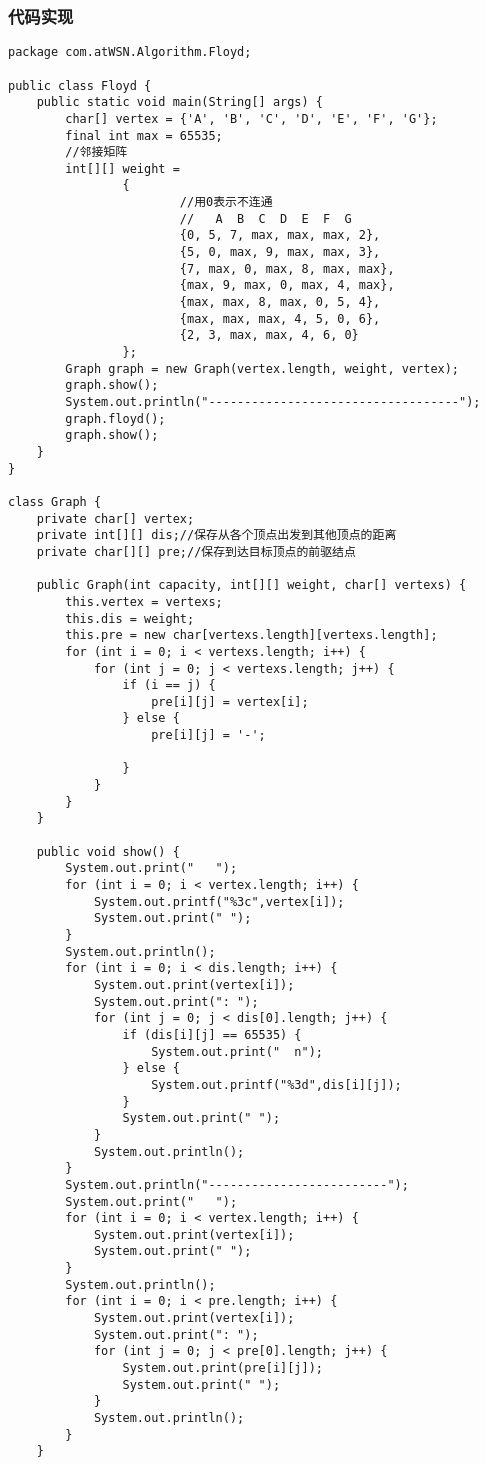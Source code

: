 \documentclass[a4paper]{report}
\begin{document}
\subsubsection{代码实现}
\begin{lstlisting}
package com.atWSN.Algorithm.Floyd;

public class Floyd {
    public static void main(String[] args) {
        char[] vertex = {'A', 'B', 'C', 'D', 'E', 'F', 'G'};
        final int max = 65535;
        //邻接矩阵
        int[][] weight =
                {
                        //用0表示不连通
                        //   A  B  C  D  E  F  G
                        {0, 5, 7, max, max, max, 2},
                        {5, 0, max, 9, max, max, 3},
                        {7, max, 0, max, 8, max, max},
                        {max, 9, max, 0, max, 4, max},
                        {max, max, 8, max, 0, 5, 4},
                        {max, max, max, 4, 5, 0, 6},
                        {2, 3, max, max, 4, 6, 0}
                };
        Graph graph = new Graph(vertex.length, weight, vertex);
        graph.show();
        System.out.println("-----------------------------------");
        graph.floyd();
        graph.show();
    }
}

class Graph {
    private char[] vertex;
    private int[][] dis;//保存从各个顶点出发到其他顶点的距离
    private char[][] pre;//保存到达目标顶点的前驱结点

    public Graph(int capacity, int[][] weight, char[] vertexs) {
        this.vertex = vertexs;
        this.dis = weight;
        this.pre = new char[vertexs.length][vertexs.length];
        for (int i = 0; i < vertexs.length; i++) {
            for (int j = 0; j < vertexs.length; j++) {
                if (i == j) {
                    pre[i][j] = vertex[i];
                } else {
                    pre[i][j] = '-';

                }
            }
        }
    }

    public void show() {
        System.out.print("   ");
        for (int i = 0; i < vertex.length; i++) {
            System.out.printf("%3c",vertex[i]);
            System.out.print(" ");
        }
        System.out.println();
        for (int i = 0; i < dis.length; i++) {
            System.out.print(vertex[i]);
            System.out.print(": ");
            for (int j = 0; j < dis[0].length; j++) {
                if (dis[i][j] == 65535) {
                    System.out.print("  n");
                } else {
                    System.out.printf("%3d",dis[i][j]);
                }
                System.out.print(" ");
            }
            System.out.println();
        }
        System.out.println("-------------------------");
        System.out.print("   ");
        for (int i = 0; i < vertex.length; i++) {
            System.out.print(vertex[i]);
            System.out.print(" ");
        }
        System.out.println();
        for (int i = 0; i < pre.length; i++) {
            System.out.print(vertex[i]);
            System.out.print(": ");
            for (int j = 0; j < pre[0].length; j++) {
                System.out.print(pre[i][j]);
                System.out.print(" ");
            }
            System.out.println();
        }
    }


\end{lstlisting}
\end{document}
